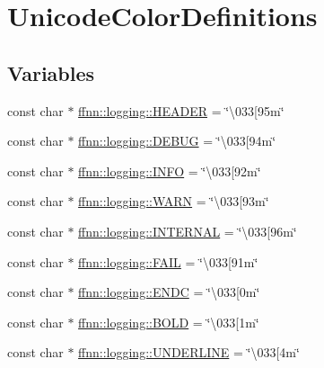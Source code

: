 \hypertarget{group___unicode_color_definitions}{\section{Unicode\-Color\-Definitions}
\label{group___unicode_color_definitions}
}
\subsection*{Variables}
\begin{DoxyCompactItemize}
\item 
const char $\ast$ \hyperlink{group___unicode_color_definitions_ga65590452b7707feb609f43a9ca306d42}{ffnn\-::logging\-::\-H\-E\-A\-D\-E\-R} = \char`\"{}\textbackslash{}033\mbox{[}95m\char`\"{}
\item 
const char $\ast$ \hyperlink{group___unicode_color_definitions_ga359f39576675d57a59f93e2addae319a}{ffnn\-::logging\-::\-D\-E\-B\-U\-G} = \char`\"{}\textbackslash{}033\mbox{[}94m\char`\"{}
\item 
const char $\ast$ \hyperlink{group___unicode_color_definitions_gab5d57e4b1db90e208ccad18ce1b0f836}{ffnn\-::logging\-::\-I\-N\-F\-O} = \char`\"{}\textbackslash{}033\mbox{[}92m\char`\"{}
\item 
const char $\ast$ \hyperlink{group___unicode_color_definitions_gafc935a693ebe97569c82dd2415bb7373}{ffnn\-::logging\-::\-W\-A\-R\-N} = \char`\"{}\textbackslash{}033\mbox{[}93m\char`\"{}
\item 
const char $\ast$ \hyperlink{group___unicode_color_definitions_ga10413caefeb3f647a80cfdb9d1874276}{ffnn\-::logging\-::\-I\-N\-T\-E\-R\-N\-A\-L} = \char`\"{}\textbackslash{}033\mbox{[}96m\char`\"{}
\item 
const char $\ast$ \hyperlink{group___unicode_color_definitions_ga2047db0e31e0a45c7c213845567afc06}{ffnn\-::logging\-::\-F\-A\-I\-L} = \char`\"{}\textbackslash{}033\mbox{[}91m\char`\"{}
\item 
const char $\ast$ \hyperlink{group___unicode_color_definitions_gab21e47dcbc216f8fc7de88bd217f9f0a}{ffnn\-::logging\-::\-E\-N\-D\-C} = \char`\"{}\textbackslash{}033\mbox{[}0m\char`\"{}
\item 
const char $\ast$ \hyperlink{group___unicode_color_definitions_ga32fca3fc24af93ce9c4ca33b4a6a3dde}{ffnn\-::logging\-::\-B\-O\-L\-D} = \char`\"{}\textbackslash{}033\mbox{[}1m\char`\"{}
\item 
const char $\ast$ \hyperlink{group___unicode_color_definitions_gab2b4d719c3fe8672abf96e00a37c799c}{ffnn\-::logging\-::\-U\-N\-D\-E\-R\-L\-I\-N\-E} = \char`\"{}\textbackslash{}033\mbox{[}4m\char`\"{}
\end{DoxyCompactItemize}


